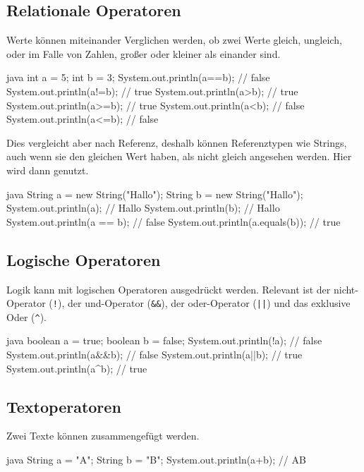 \documentclass{article}
\begin{document}
\subsection{Relationale Operatoren}
Werte können miteinander Verglichen werden, ob zwei Werte gleich, ungleich, oder im Falle von Zahlen, großer oder kleiner als einander sind.
\begin{sourcecode}{java}
int a = 5;
int b = 3;
System.out.println(a==b); // false
System.out.println(a!=b); // true
System.out.println(a>b);  // true
System.out.println(a>=b); // true
System.out.println(a<b);  // false
System.out.println(a<=b); // false
\end{sourcecode}
Dies vergleicht aber nach Referenz, deshalb können Referenztypen wie Strings, auch wenn sie den gleichen Wert haben, als nicht gleich angesehen werden. Hier wird dann  genutzt.
\begin{sourcecode}{java}
String a = new String("Hallo");
String b = new String("Hallo");
System.out.println(a);           // Hallo
System.out.println(b);           // Hallo
System.out.println(a == b);      // false
System.out.println(a.equals(b)); // true
\end{sourcecode}

\subsection{Logische Operatoren}
Logik kann mit logischen Operatoren ausgedrückt werden. Relevant ist der nicht-Operator (\texttt{!}), der und-Operator (\texttt{\&\&}), der oder-Operator (\texttt{||}) und das exklusive Oder (\texttt{\^}).
\begin{sourcecode}{java}
boolean a = true;
boolean b = false;
System.out.println(!a);   // false
System.out.println(a&&b); // false
System.out.println(a||b); // true
System.out.println(a^b);  // true 
\end{sourcecode}

\subsection{Textoperatoren}
Zwei Texte können zusammengefügt werden.
\begin{sourcecode}{java}
String a = "A";
String b = "B";
System.out.println(a+b); // AB
\end{sourcecode}
\end{document}
